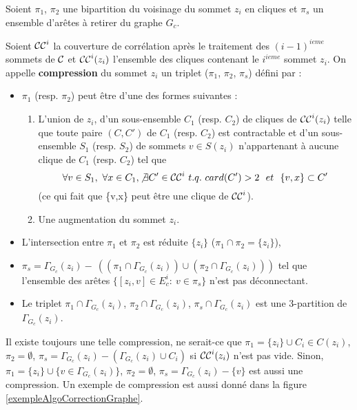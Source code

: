 Soient $\pi_1$, $\pi_2$ une bipartition du voisinage du sommet $z_i$  en cliques  et 
$\pi_s$ un ensemble d'ar\^etes \`a retirer du graphe $G_c$.  
\begin{definition}
Soient 
${\cal CC}^{i}$ la couverture de corr\'elation apr\`es le traitement des $(i-1)^{ieme}$ sommets de ${\cal C}$ et
${\cal CC}^{i}(z_i)$ l'ensemble des cliques contenant le $i^{ieme}$ sommet $z_i$.
\newline
On appelle {\bf compression} du sommet $z_i$ un triplet ($\pi_1$, $\pi_2$, $\pi_s$) d\'efini par : 
\begin{itemize}
	\item $\pi_1$ (resp. $\pi_2$) peut \^etre d'une des formes suivantes :
	\begin{enumerate}
		\item L'union de $z_i$, d'un sous-ensemble $C_1$ (resp. $C_2$) de cliques de ${\cal CC}^{i}(z_i)$ telle que toute paire $(C,C')$ de $C_1$ (resp. $C_2$) est contractable et d'un sous-ensemble $S_1$ (resp. $S_2$) de sommets $v \in S(z_i)$ n'appartenant \`a aucune clique de $C_1$ (resp. $C_2$) tel que
		$$ \forall v \in S_1,~\forall x \in C_1, \not\exists C' \in {\cal CC}^{i}~t.q.~card(C')>2~~et~~\{v,x\} \subset C'$$
		(ce qui fait que \{v,x\} peut \^etre une clique de ${\cal CC}^{i}$).
		\item Une augmentation du sommet $z_i$.
	\end{enumerate}
	\item L'intersection entre $\pi_1$ et $\pi_2$ est r\'eduite $\{z_i\}$ ($\pi_1 \cap \pi_2 = \{z_i\}$),
	\item $\pi_s=\Gamma_{G_c}(z_i)-~((\pi_1 \cap \Gamma_{G_c}(z_i) ) \cup(\pi_2 \cap \Gamma_{G_c}(z_i) ))$ tel que l'ensemble des ar\^etes  $\{[z_i,v]\in E_{c}^{i}:~v\in \pi_s\}$ n'est pas d\'econnectant.
	\item Le triplet $\pi_{1} \cap \Gamma_{G_c}(z_i)$, $\pi_{2} \cap \Gamma_{G_c}(z_i)$, $\pi_{s} \cap \Gamma_{G_c}(z_i)$  est une 3-partition de $\Gamma_{G_c}(z_i)$.
\end{itemize}
\end{definition}
Il existe toujours une telle compression, ne serait-ce que 
$\pi_1 = \{z_i\} \cup C_i \in C(z_i)$, 
$\pi_2 =  \emptyset$,
$\pi_s = \Gamma_{G_c}(z_i) -(\Gamma_{G_c}(z_i) \cup C_i) $  si ${\cal CC}^{i}(z_i)$ n'est pas vide.
Sinon, 
$\pi_1 = \{z_i\} \cup \{ v \in \Gamma_{G_c}(z_i)  \} $, 
$\pi_2 =  \emptyset$,
$\pi_s = \Gamma_{G_c}(z_i) - \{v\} $
est aussi une compression.
Un exemple de compression est aussi donn\'e dans la figure \ref{exempleAlgoCorrectionGraphe}.
